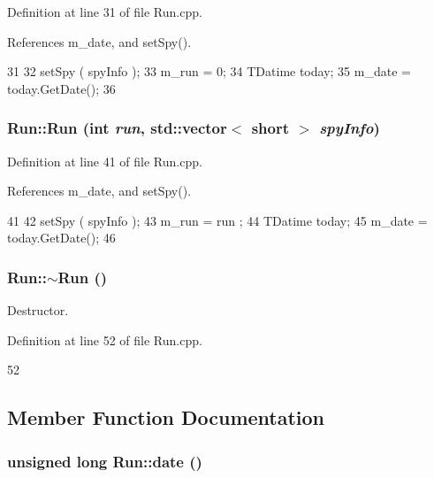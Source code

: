 Definition at line 31 of file Run.cpp.

References m\_\-date, and setSpy().


\begin{DoxyCode}
31                                         {
32   setSpy ( spyInfo );
33   m_run    = 0;
34   TDatime today;
35   m_date   = today.GetDate();
36 }
\end{DoxyCode}
\hypertarget{classRun_aa9d670242947e1dc0e31ea68a7938611}{
\subsubsection[{Run}]{\setlength{\rightskip}{0pt plus 5cm}Run::Run (int {\em run}, \/  std::vector$<$ short $>$ {\em spyInfo})}}
\label{classRun_aa9d670242947e1dc0e31ea68a7938611}


Definition at line 41 of file Run.cpp.

References m\_\-date, and setSpy().


\begin{DoxyCode}
41                                                  {
42   setSpy ( spyInfo );
43   m_run    = run ;
44   TDatime today;
45   m_date   = today.GetDate();
46 }
\end{DoxyCode}
\hypertarget{classRun_a7fa0ac1770a5067113aaa1928be3d742}{
\subsubsection[{$\sim$Run}]{\setlength{\rightskip}{0pt plus 5cm}Run::$\sim$Run ()}}
\label{classRun_a7fa0ac1770a5067113aaa1928be3d742}


Destructor. 

Definition at line 52 of file Run.cpp.


\begin{DoxyCode}
52 {}
\end{DoxyCode}


\subsection{Member Function Documentation}
\hypertarget{classRun_ae5f87d35674ded8f7a0d0ca3d842a7b4}{
\subsubsection[{date}]{\setlength{\rightskip}{0pt plus 5cm}unsigned long Run::date ()}}
\label{classRun_ae5f87d35674ded8f7a0d0ca3d842a7b4}


